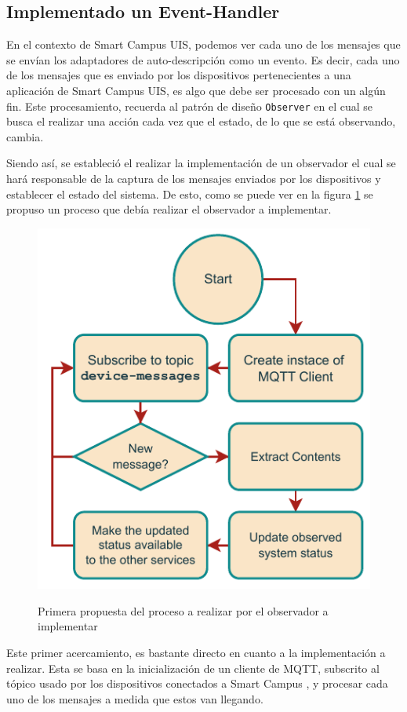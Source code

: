 
\subsection{Implementado un Event-Handler}

En el contexto de Smart Campus UIS, podemos ver cada uno de los mensajes que se envían los adaptadores de auto-descripción como un evento. Es decir, cada uno de los mensajes que es enviado por los dispositivos pertenecientes a una aplicación de Smart Campus UIS, es algo que debe ser procesado con un algún fin. Este procesamiento, recuerda al patrón de diseño \texttt{Observer} en el cual se busca el realizar una acción cada vez que el estado, de lo que se está observando, cambia.

Siendo así, se estableció el realizar la implementación de un observador el cual se hará responsable de la captura de los mensajes enviados por los dispositivos y establecer el estado del sistema. De esto, como se puede ver en la figura \ref{fig:proceso_looker} se propuso un proceso que debía realizar el observador a implementar.

\begin{figure}[ht]
    \caption{Primera propuesta del proceso a realizar \linebreak por el observador a implementar} 
    \centering
    \includegraphics[width=0.6\linewidth]{images/LookerProcess.pdf}
    \label{fig:proceso_looker}
\end{figure}

Este primer acercamiento, es bastante directo en cuanto a la implementación a realizar. Esta se basa en la inicialización de un cliente de MQTT, subscrito al tópico usado por los dispositivos conectados a Smart Campus \cite{SmartCampusGithub}, y procesar cada uno de los mensajes a medida que estos van llegando.

